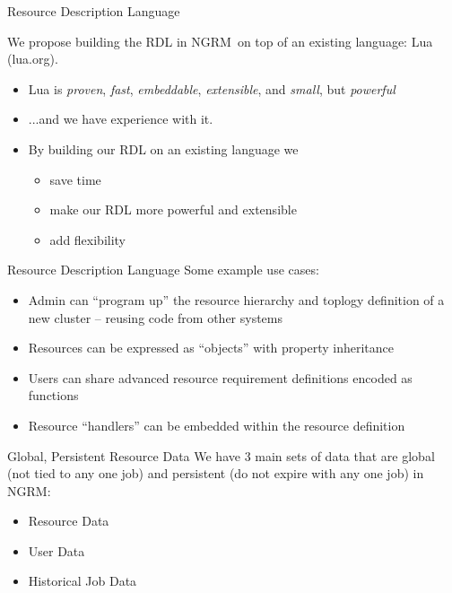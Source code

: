 \documentclass[default,pdf,colorBG,slideColor]{prosper}
\newcommand{\ngrm}{NGRM}
\begin{document}
\begin{slide}{Resource Description Language}{
{\centering
We propose building the RDL in \ngrm\ on top of an existing language:
Lua (lua.org).}
\begin{itemize}
 \item Lua is \emph{proven}, \emph{fast}, \emph{embeddable}, \emph{extensible},
      and \emph{small}, but \emph{powerful}
 \item ...and we have experience with it.
 \item By building our RDL on an existing language we
 \begin{itemize}
  \item save time
  \item make our RDL more powerful and extensible
  \item add flexibility
 \end{itemize}
\end{itemize}
}
\end{slide}
\begin{slide}{Resource Description Language}
{\centering Some example use cases:}
\begin{itemize}
 \item{Admin can ``program up'' the resource hierarchy and toplogy
       definition of a new cluster -- reusing code from other systems}
 \item{Resources can be expressed as ``objects'' with property inheritance}
 \item{Users can share advanced resource requirement definitions encoded
       as functions}
 \item{Resource ``handlers'' can be embedded within the resource definition}
\end{itemize}
\end{slide}
\begin{slide}{Global, Persistent Resource Data}
{\centering
We have 3 main sets of data that are global (not tied to any one job)
and persistent (do not expire with any one job) in \ngrm :}
\begin{itemize}
 \item{Resource Data}
 \item{User Data}
 \item{Historical Job Data}
\end{itemize}
\end{slide}
\end{document}
